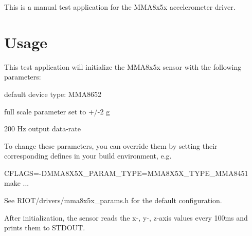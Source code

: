 This is a manual test application for the M\+M\+A8x5x accelerometer driver.

\section*{Usage}

This test application will initialize the M\+M\+A8x5x sensor with the following parameters\+:
\begin{DoxyItemize}
\item default device type\+: M\+M\+A8652
\item full scale parameter set to +/-\/2 g
\item 200 Hz output data-\/rate
\end{DoxyItemize}

To change these parameters, you can override them by setting their corresponding defines in your build environment, e.\+g. 
\begin{DoxyCode}
CFLAGS=-DMMA8X5X\_PARAM\_TYPE=MMA8X5X\_TYPE\_MMA8451 make ...
\end{DoxyCode}
 See R\+I\+O\+T/drivers/mma8x5x\+\_\+params.\+h for the default configuration.

After initialization, the sensor reads the x-\/, y-\/, z-\/axis values every 100ms and prints them to S\+T\+D\+O\+UT. 